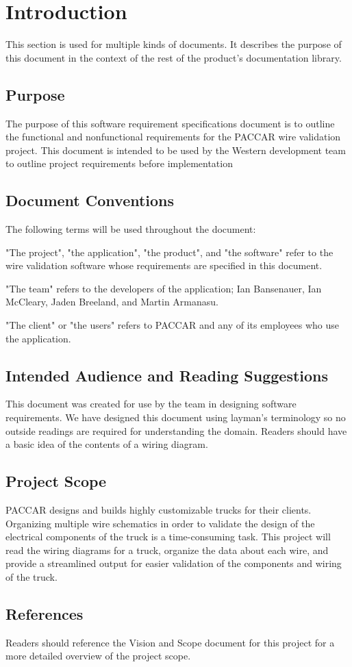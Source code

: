 \section{Introduction}
 This section is used for multiple kinds of documents.  It describes the
 purpose of this document in the context of the rest of the product's
 documentation library.  

\subsection{Purpose}
The purpose of this software requirement specifications document is to outline the functional and nonfunctional requirements for the PACCAR wire validation project. This document is intended to be used by the Western development team to outline project requirements before implementation

\subsection{Document Conventions}
 The following terms will be used throughout the document:
 
"The project", "the application", "the product", and "the software" refer to the wire validation software whose requirements are specified in this document.

"The team" refers to the developers of the application; Ian Bansenauer, Ian McCleary, Jaden Breeland, and Martin Armanasu.

"The client" or "the users" refers to PACCAR and any of its employees who use the application.

\subsection{Intended Audience and Reading Suggestions}
 This document was created for use by the team in designing software requirements. We have designed this document using layman's terminology so no outside readings are required for understanding the domain. Readers should have a basic idea of the contents of a wiring diagram.

\subsection{Project Scope}
PACCAR designs and builds highly customizable trucks for their clients. Organizing multiple wire schematics in order to validate the design of the electrical components of the truck is a time-consuming task. This project will read the wiring diagrams for a truck, organize the data about each wire, and provide a streamlined output for easier validation of the components and wiring of the truck.


\subsection{References}
 Readers should reference the Vision and Scope document for this project for a more detailed overview of the project scope.
